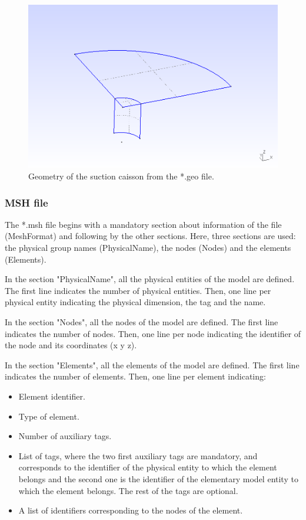 \documentclass[a4]{article}
\begin{document}
\begin{figure}[tbh!]
	\centering
	\includegraphics[scale=0.6]{geometry_geo.png}
	\caption{Geometry of the suction caisson from the *.geo file.}
	\label{fig:geometry_geo}
\end{figure}

\subsubsection{MSH file}

The *.msh file begins with a mandatory section about information of the file (MeshFormat) and following by the other sections. Here, three sections are used: the physical group names (PhysicalName), the nodes (Nodes) and the elements (Elements).

In the section "PhysicalName", all the physical entities of the model are defined. The first line indicates the number of physical entities. Then, one line per physical entity indicating the physical dimension, the tag and the name.  

In the section "Nodes", all the nodes of the model are defined. The first line indicates the number of nodes. Then, one line per node indicating the identifier of the node and its coordinates (x y z).

In the section "Elements", all the elements of the model are defined. The first line indicates the number of elements. Then, one line per element indicating:

\begin{itemize}
	\item Element identifier.
	\item Type of element.
	\item Number of auxiliary tags.
	\item List of tags, where the two first auxiliary tags are mandatory, and corresponds to the identifier of the physical entity to which the element belongs and the second one is the identifier of the elementary model entity to which the element belongs. The rest of the tags are optional.
	\item A list of identifiers corresponding to the nodes of the element.
\end{itemize}
\end{document}
